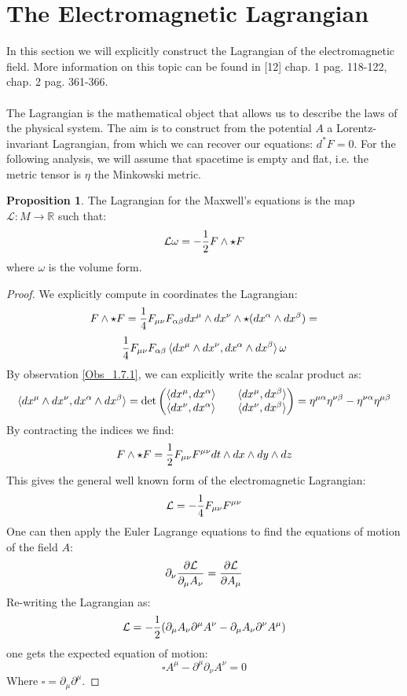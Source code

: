\documentclass[12pt,a4paper]{report}
\theoremstyle{definition}
\theoremstyle{Theorem}
\newtheorem{Prop}[Def]{Proposition}
\theoremstyle{definition}
\theoremstyle{definition}
\begin{document}
	\section{The Electromagnetic Lagrangian}
	In this section we will explicitly construct the Lagrangian of the electromagnetic field. More information on this topic can be found in [12] chap. 1 pag. 118-122, chap. 2 pag. 361-366.
	\\\\
	The Lagrangian is the mathematical object that allows us to describe the laws of the physical system. The aim is to construct from the potential $A$ a Lorentz-invariant Lagrangian, from which we can recover our equations: $d^*F=0$. For the following analysis, we will assume that spacetime is empty and flat, i.e. the metric tensor is $\eta$ the Minkowski metric. 
	\begin{Prop}\label{Prop_8.1.2}
		The Lagrangian for the Maxwell's equations is the map $\mathcal{L}:M\rightarrow \mathbb{R}$ such that:
		$$\mathcal{L}\omega=-{1\over 2}F\wedge \star F$$
		where $\omega$ is the volume form.
	\end{Prop}
	\begin{proof}
		We explicitly compute in coordinates the Lagrangian:
		$$F\wedge \star F={1\over 4}F_{\mu\nu}F_{\alpha\beta}dx^\mu\wedge dx^\nu \wedge \star (dx^\alpha\wedge dx^\beta)=$$
		$${1\over 4}F_{\mu\nu}F_{\alpha\beta}\braket{dx^\mu\wedge dx^\nu,dx^\alpha\wedge dx^\beta}\omega$$
		By observation \ref{Obs_1.7.1}, we can explicitly write the scalar product as:
		$$\braket{dx^\mu\wedge dx^\nu,dx^\alpha\wedge dx^\beta}=\det
		\begin{pmatrix}
			\braket{dx^\mu,dx^\alpha} && \braket{dx^\mu,dx^\beta}\\
			\braket{dx^\nu,dx^\alpha} && \braket{dx^\nu,dx^\beta}\\
		\end{pmatrix}=\eta^{\mu\alpha}\eta^{\nu\beta}-\eta^{\nu\alpha}\eta^{\mu\beta}$$
		By contracting the indices we find:
		$$F\wedge \star F={1\over 2}F_{\mu\nu}F^{\mu\nu}dt\wedge dx\wedge dy\wedge dz$$
		This gives the general well known form of the electromagnetic Lagrangian:
		\begin{equation}\label{E_M_Lag}
			\mathcal{L}=-{1\over 4}F_{\mu\nu}F^{\mu\nu}
		\end{equation}
		One can then apply the Euler Lagrange equations to find the equations of motion of the field $A$:
		$$\partial_\nu{\partial \mathcal{L}\over \partial_\mu A_\nu}={\partial \mathcal{L}\over \partial A_\mu}$$
		Re-writing the Lagrangian as:
		$$\mathcal{L}=-{1\over 2}(\partial_\mu A_\nu\partial^\mu A^\nu-\partial_\mu A_\nu\partial^\nu A^\mu)$$
		one gets the expected equation of motion:
		$$\square A^\mu-\partial^\mu\partial_\nu A^\nu=0$$
		Where $\square=\partial_\mu\partial^\mu$.
	\end{proof}
\end{document}
